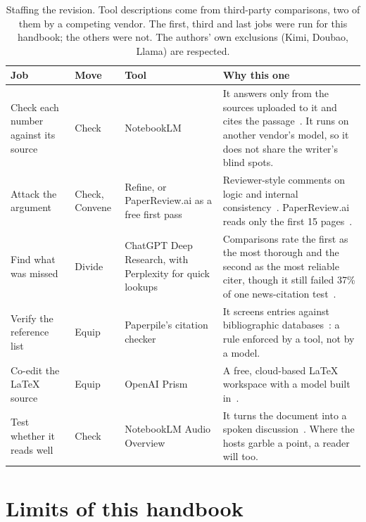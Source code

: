 \documentclass[11pt,letterpaper]{article}
\begin{document}
\begin{table}[H]
\sffamily\small
\begin{tabularx}{\textwidth}{@{}R{3.1cm}@{\hspace{0.9em}}R{1.45cm}@{\hspace{0.9em}}R{3.3cm}@{\hspace{0.9em}}Y@{}}
\toprule
\textbf{Job} & \textbf{Move} & \textbf{Tool} & \textbf{Why this one} \\
\midrule
Check each number against its source & Check & NotebookLM & It answers only from the sources
  uploaded to it and cites the passage~\cite{notebooklm}. It runs on another vendor's model,
  so it does not share the writer's blind spots. \\ \addlinespace[0.28em]
Attack the argument & Check, Convene & Refine, or PaperReview.ai as a free first pass &
  Reviewer-style comments on logic and internal consistency~\cite{manusights}. PaperReview.ai
  reads only the first 15 pages~\cite{manusightspr}. \\ \addlinespace[0.28em]
Find what was missed & Divide & ChatGPT Deep Research, with Perplexity for quick lookups &
  Comparisons rate the first as the most thorough and the second as the most reliable citer,
  though it still failed 37\% of one news-citation test~\cite{newscatcher,airankings}. \\ \addlinespace[0.28em]
Verify the reference list & Equip & Paperpile's citation checker & It screens entries against
  bibliographic databases~\cite{superfresh}: a rule enforced by a tool, not by a model. \\ \addlinespace[0.28em]
Co-edit the LaTeX source & Equip & OpenAI Prism & A free, cloud-based LaTeX workspace with a
  model built in~\cite{prism}. \\ \addlinespace[0.28em]
Test whether it reads well & Check & NotebookLM Audio Overview & It turns the document into a
  spoken discussion~\cite{notebooklm}. Where the hosts garble a point, a reader will too. \\
\bottomrule
\end{tabularx}
\caption{Staffing the revision. Tool descriptions come from third-party comparisons, two
of them by a competing vendor. The first, third and last jobs were run for this handbook; the
others were not. The authors' own exclusions (Kimi, Doubao, Llama) are respected.}
\label{tab:self}
\end{table}

\section*{Limits of this handbook}
\end{document}
